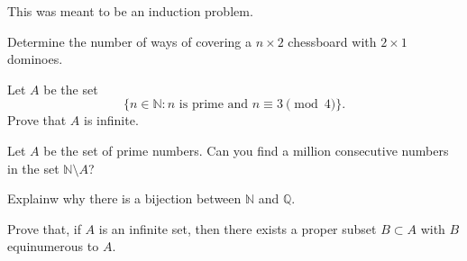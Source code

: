 \documentclass[12pt]{midterm}
\begin{document}
\begin{exam}
\begin{problem}[350]
This was meant to be an induction problem.

Determine the number of ways of covering a $n \times 2$ chessboard
with $2 \times 1$ dominoes.
\end{problem}

\begin{solution}\begin{solutiontext}
\end{solutiontext}\end{solution}

\begin{problem}[350]
Let $A$ be the set 
$$
\{ n \in \mathbb{N} : \mbox{$n$ is prime and $n \equiv 3 \pmod 4$}\}.
$$
Prove that $A$ is infinite.
\end{problem}

\begin{solution}\begin{solutiontext}
\end{solutiontext}\end{solution}

\begin{problem}[350]
Let $A$ be the set of prime numbers.  Can you find a million
consecutive numbers in the set $\mathbb{N} \setminus A$?
\end{problem}

\begin{solution}\begin{solutiontext}
\end{solutiontext}\end{solution}


\begin{problem}[350]
Explainw why there is a bijection between $\mathbb{N}$ and $\mathbb{Q}$.
\end{problem}

\begin{solution}\begin{solutiontext}
\end{solutiontext}\end{solution}

\begin{problem}[350]
Prove that, if $A$ is an infinite set, then there exists a proper
subset $B \subset A$ with $B$ equinumerous to $A$.
\end{problem}


\end{exam}
\end{document}

